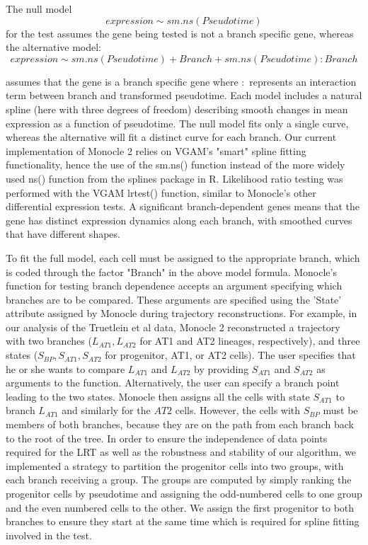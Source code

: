 \documentclass[10pt,oneside]{article}\usepackage[]{graphicx}\usepackage[]{color}
\begin{document}
The null model 
\begin{equation}
expression \sim sm.ns(Pseudotime)
\end{equation}
for the test assumes the gene being tested is not a branch specific gene, whereas the alternative model: 
\begin{equation}
expression \sim sm.ns(Pseudotime) + Branch + sm.ns(Pseudotime) : Branch 
\end{equation}

assumes that the gene is a branch specific gene where $:$  represents an interaction term between branch and transformed pseudotime. Each model includes a natural spline (here with three degrees of freedom) describing smooth changes in mean expression as a function of pseudotime. The null model fits only a single curve, whereas the alternative will fit a distinct curve for each branch. Our current implementation of Monocle 2 relies on VGAM's "smart" spline fitting functionality, hence the use of the sm.ns() function instead of the more widely used ns() function from the splines package in R. Likelihood ratio testing was performed with the VGAM lrtest() function, similar to Monocle's other differential expression tests. A significant branch-dependent genes means that the gene has distinct expression dynamics along each branch, with smoothed curves that have different shapes.

To fit the full model, each cell must be assigned to the appropriate branch, which is coded through the factor "Branch" in the above model formula. Monocle's function for testing branch dependence accepts an argument specifying which branches are to be compared. These arguments are specified using the 'State' attribute assigned by Monocle during trajectory reconstructions. For example, in our analysis of the Truetlein et al data, Monocle 2 reconstructed a trajectory with two branches ($L_{AT1}, L_{AT2}$ for AT1 and AT2 lineages, respectively), and three states ($S_{BP}, S_{AT1}, S_{AT2}$ for progenitor, AT1, or AT2 cells). The user specifies that he or she wants to compare $L_{AT1}$ and $L_{AT2}$ by providing $S_{AT1}$ and $S_{AT2}$ as arguments to the function. Alternatively, the user can specify a branch point leading to the two states. Monocle then assigns all the cells with state $S_{AT1}$ to branch $L_{AT1}$ and similarly for the $AT2$ cells. However, the cells with $S_{BP}$ must be members of both branches, because they are on the path from each branch back to the root of the tree. In order to ensure the independence of data points required for the LRT as well as the robustness and stability of our algorithm, we implemented a strategy to partition the progenitor cells into two groups, with each branch receiving a group. The groups are computed by simply ranking the progenitor cells by pseudotime and assigning the odd-numbered cells to one group and the even numbered cells to the other. We assign the first progenitor to both branches to ensure they start at the same time which is required for spline fitting involved in the test. 
\end{document}
